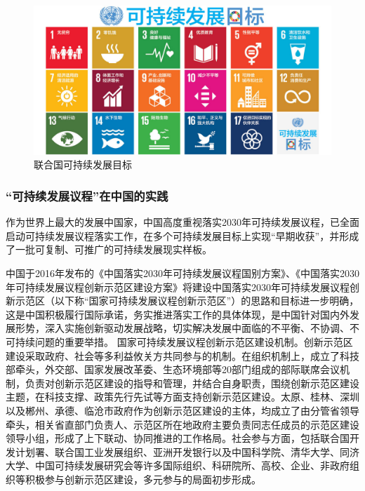 \documentclass[
  12pt,
]{ctexart}
\begin{document}
\begin{figure}

{\centering \includegraphics[width=0.9\linewidth]{../figures/SDGGoals} 

}

\caption{联合国可持续发展目标}\label{fig:unnamed-chunk-2}
\end{figure}

\hypertarget{ux53efux6301ux7eedux53d1ux5c55ux8baeux7a0bux5728ux4e2dux56fdux7684ux5b9eux8df5}{%
\subsubsection{``可持续发展议程''在中国的实践}\label{ux53efux6301ux7eedux53d1ux5c55ux8baeux7a0bux5728ux4e2dux56fdux7684ux5b9eux8df5}}

作为世界上最大的发展中国家，中国高度重视落实2030年可持续发展议程，已全面启动可持续发展议程落实工作，在多个可持续发展目标上实现``早期收获''，并形成了一批可复制、可推广的可持续发展现实样板。

中国于2016年发布的《中国落实2030年可持续发展议程国别方案》、《中国落实2030年可持续发展议程创新示范区建设方案》将建设中国落实2030年可持续发展议程创新示范区（以下称``国家可持续发展议程创新示范区''）的思路和目标进一步明确，这是中国积极履行国际承诺，务实推进落实工作的具体体现，是中国针对国内外发展形势，深入实施创新驱动发展战略，切实解决发展中面临的不平衡、不协调、不可持续问题的重要举措。
国家可持续发展议程创新示范区建设机制。创新示范区建设采取政府、社会等多利益攸关方共同参与的机制。在组织机制上，成立了科技部牵头，外交部、国家发展改革委、生态环境部等20部门组成的部际联席会议机制，负责对创新示范区建设的指导和管理，并结合自身职责，围绕创新示范区建设主题，在科技支撑、政策先行先试等方面支持创新示范区建设。太原、桂林、深圳以及郴州、承德、临沧市政府作为创新示范区建设的主体，均成立了由分管省领导牵头，相关省直部门负责人、示范区所在地政府主要负责同志任成员的示范区建设领导小组，形成了上下联动、协同推进的工作格局。社会参与方面，包括联合国开发计划署、联合国工业发展组织、亚洲开发银行以及中国科学院、清华大学、同济大学、中国可持续发展研究会等许多国际组织、科研院所、高校、企业、非政府组织等积极参与创新示范区建设，多元参与的局面初步形成。
\end{document}

